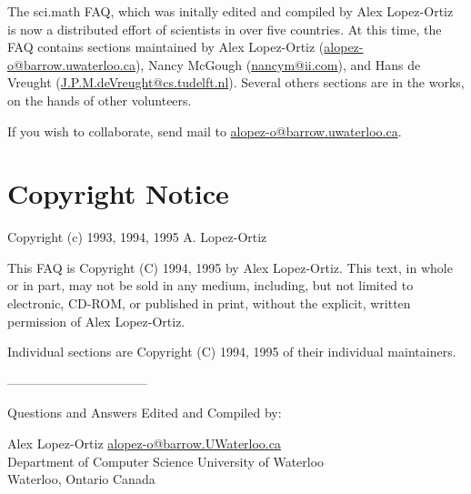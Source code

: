 The sci.math FAQ, which was initally edited and compiled by Alex
Lopez-Ortiz is now a distributed effort of scientists in over five
countries. At this time, the FAQ contains sections maintained by Alex
Lopez-Ortiz (\url{alopez-o@barrow.uwaterloo.ca}), Nancy McGough
(\url{nancym@ii.com}), and Hans de Vreught
(\url{J.P.M.deVreught@cs.tudelft.nl}). Several others sections are in
the works, on the hands of other volunteers.

If you wish to collaborate, send mail to
\url{alopez-o@barrow.uwaterloo.ca}.


\section{Copyright Notice}

Copyright (c) 1993, 1994, 1995 A. Lopez-Ortiz

This FAQ is Copyright (C) 1994, 1995 by Alex Lopez-Ortiz. This text, in
whole or in part, may not be sold in any medium, including, but not
limited to electronic, CD-ROM, or published in print, without the
explicit, written permission of Alex Lopez-Ortiz.

Individual sections are Copyright (C) 1994, 1995 of their individual
maintainers.


---------------------------------

\noindent Questions and Answers Edited and Compiled by:

\medskip

\noindent Alex Lopez-Ortiz          \url{alopez-o@barrow.UWaterloo.ca}\\
Department of Computer Science     University of Waterloo\\
Waterloo, Ontario                             Canada\\
